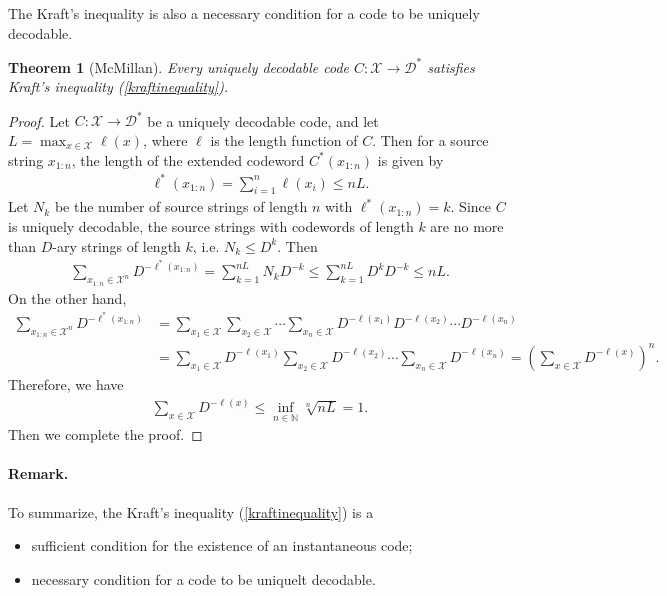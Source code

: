 \documentclass{article}
\numberwithin{equation}{section}
\newcommand{\bbN}{\mathbb{N}}
\renewcommand{\cal}{\mathcal}
\theoremstyle{plain}
\newtheorem{theorem}{Theorem}[section]
\theoremstyle{definition}
\begin{document}
The Kraft's inequality is also a necessary condition for a code to be uniquely decodable.
\begin{theorem}[McMillan]
Every uniquely decodable code $C:\cal{X}\to\cal{D}^*$ satisfies Kraft's inequality (\ref{kraftinequality}).
\end{theorem}
\begin{proof}
Let $C:\cal{X}\to\cal{D}^*$ be a uniquely decodable code, and let $L=\max_{x\in\cal{X}}\ell(x)$, where $\ell$ is the length function of $C$. Then for a source string $x_{1:n}$, the length of the extended codeword $C^*(x_{1:n})$ is given by
\begin{align*}
	\ell^*(x_{1:n})=\sum_{i=1}^n\ell(x_i)\leq nL.
\end{align*}
Let $N_k$ be the number of source strings of length $n$ with $\ell^*(x_{1:n})= k$. Since $C$ is uniquely decodable, the source strings with codewords of length $k$ are no more than $D$-ary strings of length $k$, i.e. $N_k\leq D^k$. Then
\begin{align*}
	\sum_{x_{1:n}\in\cal{X}^n}D^{-\ell^*(x_{1:n})}=\sum_{k=1}^{nL} N_kD^{-k}\leq\sum_{k=1}^{nL} D^kD^{-k}\leq nL.
\end{align*}
On the other hand,
\begin{align*}
	\sum_{x_{1:n}\in\cal{X}^n}D^{-\ell^*(x_{1:n})}&=\sum_{x_1\in\cal{X}}\sum_{x_2\in\cal{X}}\cdots \sum_{x_n\in\cal{X}}D^{-\ell(x_1)}D^{-\ell(x_2)}\cdots D^{-\ell(x_n)}\\
	&=\sum_{x_1\in\cal{X}}D^{-\ell(x_1)}\sum_{x_2\in\cal{X}}D^{-\ell(x_2)}\cdots \sum_{x_n\in\cal{X}}D^{-\ell(x_n)}=\left(\sum_{x\in\cal{X}}D^{-\ell(x)}\right)^n.
\end{align*}
Therefore,  we have
\begin{align*}
\sum_{x\in\cal{X}}D^{-\ell(x)}\leq\inf_{n\in\bbN}\sqrt[n]{nL}=1.
\end{align*}
Then we complete the proof.
\end{proof}
\paragraph{Remark.} To summarize, the Kraft's inequality (\ref{kraftinequality}) is a
\begin{itemize}
	\item sufficient condition for the existence of an instantaneous code;
	\item necessary condition for a code to be uniquelt decodable.
\end{itemize}
\end{document}
